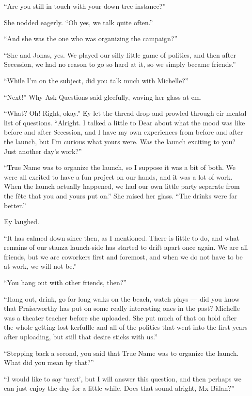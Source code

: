 ``Are you still in touch with your down-tree instance?''

She nodded eagerly. ``Oh yes, we talk quite often.''

``And she was the one who was organizing the campaign?''

``She and Jonas, yes. We played our silly little game of politics, and then after Secession, we had no reason to go so hard at it, so we simply became friends.''

``While I'm on the subject, did you talk much with Michelle?''

``Next!'' Why Ask Questions said gleefully, waving her glass at em.

``What? Oh! Right, okay.'' Ey let the thread drop and prowled through eir mental list of questions. ``Alright. I talked a little to Dear about what the mood was like before and after Secession, and I have my own experiences from before and after the launch, but I'm curious what yours were. Was the launch exciting to you? Just another day's work?''

``True Name was to organize the launch, so I suppose it was a bit of both. We were all excited to have a fun project on our hands, and it was a lot of work. When the launch actually happened, we had our own little party separate from the fête that you and yours put on.'' She raised her glass. ``The drinks were far better.''

Ey laughed.

``It has calmed down since then, as I mentioned. There is little to do, and what remains of our stanza launch-side has started to drift apart once again. We are all friends, but we are coworkers first and foremost, and when we do not have to be at work, we will not be.''

``You hang out with other friends, then?''

``Hang out, drink, go for long walks on the beach, watch plays — did you know that Praiseworthy has put on some really interesting ones in the past? Michelle was a theater teacher before she uploaded. She put much of that on hold after the whole getting lost kerfuffle and all of the politics that went into the first years after uploading, but still that desire sticks with us.''

``Stepping back a second, you said that True Name was to organize the launch. What did you mean by that?''

``I would like to say `next', but I will answer this question, and then perhaps we can just enjoy the day for a little while. Does that sound alright, Mx Bălan?''

